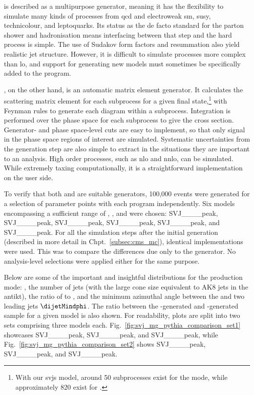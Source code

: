 
\PYTHIAEIGHT is described as a multipurpose generator, meaning it has the flexibility to simulate many kinds of processes from \acrshort{qcd} and electroweak \acrshort{sm}, \acrshort{susy}, technicolour, and leptoquarks. Its status as the de facto standard for the parton shower and hadronisation means interfacing between that step and the hard process is simple. The use of Sudakov form factors and resummation also yield realistic jet structure. However, it is difficult to simulate processes more complex than \acrshort{lo}, and support for generating new models must sometimes be specifically added to the program.

\MGvATNLO, on the other hand, is an automatic matrix element generator. It calculates the scattering matrix element for each subprocess for a given final state,\footnote{With our \glspl{svj} model, around 50 subprocesses exist for the \schannel mode, while approximately 820 exist for \tchannel.} with Feynman rules to generate each diagram within a subprocess. Integration is performed over the phase space for each subprocess to give the cross section. Generator- and phase space-level cuts are easy to implement, so that only signal in the phase space regions of interest are simulated. Systematic uncertainties from the generation step are also simple to extract in the situations they are important to an analysis. High order processes, such as \acrshort{nlo} and \acrshort{nnlo}, can be simulated. While extremely taxing computationally, it is a straightforward implementation on the user side.

To verify that both \PYTHIA and \MADGRAPH are suitable generators, 100,000 events were generated for a selection of parameter points with each program independently. Six models encompassing a sufficient range of \mZprime, \mDark, and \rinv were chosen: SVJ\_\_\_\_\-peak, SVJ\_\_\_\_peak, SVJ\_\_\_\_\-peak, SVJ\_\_\_\_\-peak, SVJ\_\_\_\_\-peak, and SVJ\_\_\_\_\-peak. For all the simulation steps after the initial generation (described in more detail in Chpt.~\ref{subsec:cms_mc}), identical implementations were used. This was to compare the differences due only to the generator. No analysis-level selections were applied either for the same purpose.

Below are some of the important and insightful distributions for the \schannel production mode: \mT, the number of \glspl{jet} (with the large cone size equivalent to AK8 \glspl{jet} in the \gls{antikt}), the ratio of \ptmiss to \mT, and the minimum azimuthal angle between the \ptmiss and two leading \glspl{jet} $\dijetMindphi$. The ratio between the \MADGRAPH-generated and \PYTHIA-generated sample for a given model is also shown. For readability, plots are split into two sets comprising three models each. Fig.~\ref{fig:svj_mg_pythia_comparison_set1} showcases SVJ\_\_\_\_\-peak, SVJ\_\_\_\_\-peak, and SVJ\_\_\_\_\-peak, while Fig.~\ref{fig:svj_mg_pythia_comparison_set2} shows SVJ\_\_\_\_\-peak, SVJ\_\_\_\_\-peak, and SVJ\_\_\_\_\-peak.

